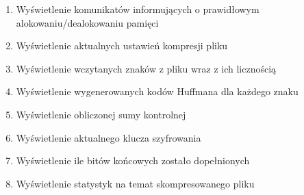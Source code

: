 \documentclass[]{article}
\begin{document}
\begin{enumerate}
\def\labelenumi{\arabic{enumi}.}
\item
Wyświetlenie komunikatów informujących o prawidłowym alokowaniu/dealokowaniu pamięci
\item
Wyświetlenie aktualnych ustawień kompresji pliku
\item
Wyświetlenie wczytanych znaków z pliku wraz z ich licznością
\item
Wyświetlenie wygenerowanych kodów Huffmana dla każdego znaku
\item
Wyświetlenie obliczonej sumy kontrolnej
\item
Wyświetlenie aktualnego klucza szyfrowania
\item
Wyświetlenie ile bitów końcowych zostało dopełnionych
\item
Wyświetlenie statystyk na temat skompresowanego pliku

\end{enumerate}
\end{document}
